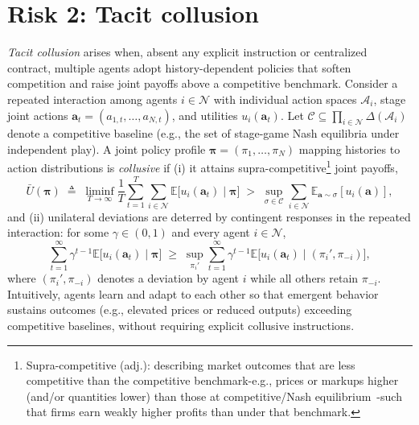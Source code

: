 \documentclass[11pt, letterpaper, shortlabels]{berkeley}
\begin{document}
\section{Risk 2: Tacit collusion}


\begin{boxE}
\textit{Tacit collusion} arises when, absent any explicit instruction or centralized contract, multiple agents adopt history-dependent policies that soften competition and raise joint payoffs above a competitive benchmark. Consider a repeated interaction among agents $i \in \mathcal{N}$ with individual action spaces $\mathcal{A}_i$, stage joint actions $\mathbf{a}_t = (a_{1,t},\dots,a_{N,t})$, and utilities $u_i(\mathbf{a}_t)$. Let $\mathcal{C} \subseteq \prod_{i \in \mathcal{N}} \Delta(\mathcal{A}_i)$ denote a competitive baseline (e.g., the set of stage-game Nash equilibria under independent play). A joint policy profile $\boldsymbol{\pi} = (\pi_1,\dots,\pi_N)$ mapping histories to action distributions is \emph{collusive} if (i) it attains supra-competitive\footnote{Supra-competitive (adj.): describing market outcomes that are less competitive than the competitive benchmark-e.g., prices or markups higher (and/or quantities lower) than those at competitive/Nash equilibrium~\citep{nash1950equilibrium}-such that firms earn weakly higher profits than under that benchmark.} joint payoffs,
\[
\bar U(\boldsymbol{\pi}) \;\triangleq\; \liminf_{T\to\infty}\frac{1}{T}\sum_{t=1}^T \sum_{i \in \mathcal{N}} \mathbb{E}\big[u_i(\mathbf{a}_t)\mid \boldsymbol{\pi}\big]
\;>\;
\sup_{\sigma\in\mathcal{C}}\sum_{i \in \mathcal{N}} \mathbb{E}_{\mathbf{a}\sim\sigma}\!\left[u_i(\mathbf{a})\right],
\]
and (ii) unilateral deviations are deterred by contingent responses in the repeated interaction: for some $\gamma\in(0,1)$ and every agent $i \in \mathcal{N}$,
\[
\sum_{t=1}^\infty \gamma^{t-1}\mathbb{E}\big[u_i(\mathbf{a}_t)\mid \boldsymbol{\pi}\big]
\;\ge\;
\sup_{\pi_i'} \sum_{t=1}^\infty \gamma^{t-1}\mathbb{E}\big[u_i(\mathbf{a}_t)\mid (\pi_i',\pi_{-i})\big],
\]
where $(\pi_i', \pi_{-i})$ denotes a deviation by agent $i$ while all others retain $\pi_{-i}$. Intuitively, agents learn and adapt to each other so that emergent behavior sustains outcomes (e.g., elevated prices or reduced outputs) exceeding competitive baselines, without requiring explicit collusive instructions.
\end{boxE}
\end{document}
